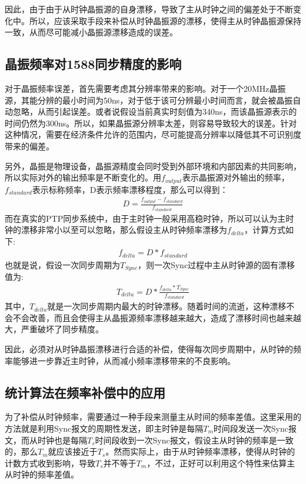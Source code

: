 因此，由于由于从时钟晶振源的自身漂移，导致了主从时钟之间的偏差处于不断变化中。所以，应该采取手段来补偿从时钟晶振源的漂移，使得主从时钟晶振源保持一致，从而尽可能减小晶振源漂移造成的误差。

\subsection{晶振频率对1588同步精度的影响}
对于晶振频率误差，首先需要考虑其分辨率带来的影响。对于一个20MHz晶振源，其能分辨的最小时间为50ns，对于低于该可分辨最小时间而言，就会被晶振自动忽略，从而引起误差。或者说假设当前真实时刻值为340ns，而该晶振源表示的时间仍然为300ns。所以，如果晶振源分辨率太差，则容易导致较大的误差。针对这种情况，需要在经济条件允许的范围内，尽可能提高分辨率以降低其不可识别度带来的偏差。

另外，晶振是物理设备，晶振源精度会同时受到外部环境和内部因素的共同影响，所以实际对外的输出频率是不断变化的。用$f_{output}$表示晶振源对外输出的频率，$f_{standard}$表示标称频率，D表示频率漂移程度，那么可以得到：
\begin {align}
D = \frac{f_{output} - f_{standard}}{f_{standard}}
\end{align}
而在真实的PTP同步系统中，由于主时钟一般采用高稳时钟，所以可以认为主时钟的漂移非常小以至可以忽略，那么假设主从时钟频率漂移为$f_{delta}$，计算方式如下:
\begin {align}
f_{delta} = D * f_{standard}
\end{align}
也就是说，假设一次同步周期为$T_{Sync}$，则一次Sync过程中主从时钟源的固有漂移值为:
\begin {align}
T_{delta} = D * \frac{f_{delta} * T_{Sync}}{f_{standard}}
\end{align}
其中，$T_{delta}$就是一次同步周期内最大的时钟漂移。随着时间的流逝，这种漂移不会不会改善，而且会使得主从晶振源频率漂移越来越大，造成了漂移时间也越来越大，严重破坏了同步精度。

因此，必须对从时钟晶振漂移进行合适的补偿，使得每次同步周期中，从时钟的频率能够进一步靠近主时钟，从而减小频率漂移带来的不良影响。

\subsection{统计算法在频率补偿中的应用}
为了补偿从时钟频率，需要通过一种手段来测量主从时间的频率差值。这里采用的方法就是利用Sync报文的周期性发送，即主时钟是每隔$T_{m}$时间段发送一次Sync报文，而从时钟也是每隔$T_{s}$时间段收到一次Sync报文，假设主从时钟的频率是一致的，那么$T_{m}$就应该接近于$T_{s}$。然而实际上，由于从时钟频率漂移，使得从时钟的计数方式收到影响，导致$T_{s}$并不等于$T_{m}$，不过，正好可以利用这个特性来估算主从时钟的频率差值。

